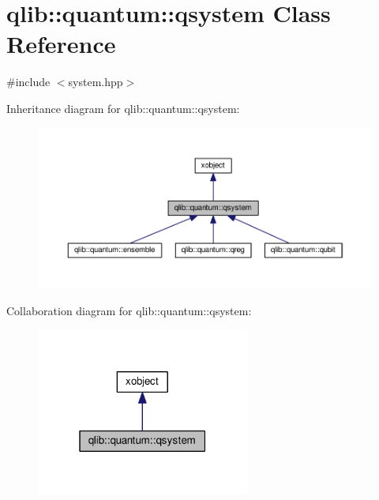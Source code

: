 \hypertarget{classqlib_1_1quantum_1_1qsystem}{}\section{qlib\+:\+:quantum\+:\+:qsystem Class Reference}
\label{classqlib_1_1quantum_1_1qsystem}


{\ttfamily \#include $<$system.\+hpp$>$}



Inheritance diagram for qlib\+:\+:quantum\+:\+:qsystem\+:\nopagebreak
\begin{figure}[H]
\begin{center}
\leavevmode
\includegraphics[width=350pt]{classqlib_1_1quantum_1_1qsystem__inherit__graph}
\end{center}
\end{figure}


Collaboration diagram for qlib\+:\+:quantum\+:\+:qsystem\+:\nopagebreak
\begin{figure}[H]
\begin{center}
\leavevmode
\includegraphics[width=199pt]{classqlib_1_1quantum_1_1qsystem__coll__graph}
\end{center}
\end{figure}
